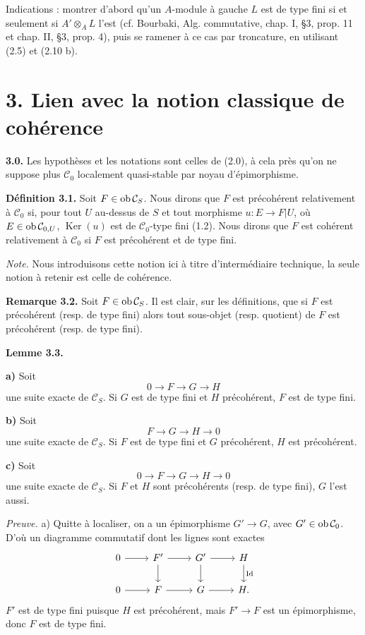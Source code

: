 \documentclass[11pt]{article}
\providecommand{\Ker}{\operatorname{Ker}}
\begin{document}
Indications : montrer d'abord qu'un \(A\)-module à gauche \(L\) est de type fini si et seulement si \(A'\otimes_A L\) l'est (cf. Bourbaki, Alg. commutative, chap. I, §3, prop. 11 et chap. II, §3, prop. 4), puis se ramener à ce cas par troncature, en utilisant (2.5) et (2.10 b).

\section*{3. Lien avec la notion classique de cohérence}

\textbf{3.0.} Les hypothèses et les notations sont celles de (2.0), à cela près qu'on ne suppose plus \(\mathcal C_0\) localement quasi-stable par noyau d'épimorphisme.

\textbf{Définition 3.1.} Soit \(F\in\operatorname{ob}\mathcal C_S\). Nous dirons que \(F\) est précohérent relativement à \(\mathcal C_0\) si, pour tout \(U\) au-dessus de \(S\) et tout morphisme \(u:E\to F|U\), où \(E\in\operatorname{ob}\mathcal C_{0,U}\), \(\Ker(u)\) est de \(\mathcal C_0\)-type fini (1.2). Nous dirons que \(F\) est cohérent relativement à \(\mathcal C_0\) si \(F\) est précohérent et de type fini.

\emph{Note.} Nous introduisons cette notion ici à titre d'intermédiaire technique, la seule notion à retenir est celle de cohérence.

\textbf{Remarque 3.2.} Soit \(F\in\operatorname{ob}\mathcal C_S\). Il est clair, sur les définitions, que si \(F\) est précohérent (resp. de type fini) alors tout sous-objet (resp. quotient) de \(F\) est précohérent (resp. de type fini).

\textbf{Lemme 3.3.}

\textbf{a)} Soit
\[
  0\longrightarrow F\longrightarrow G\longrightarrow H
\]
une suite exacte de \(\mathcal C_S\). Si \(G\) est de type fini et \(H\) précohérent, \(F\) est de type fini.

\textbf{b)} Soit
\[
  F\longrightarrow G\longrightarrow H\longrightarrow 0
\]
une suite exacte de \(\mathcal C_S\). Si \(F\) est de type fini et \(G\) précohérent, \(H\) est précohérent.

\textbf{c)} Soit
\[
  0\longrightarrow F\longrightarrow G\longrightarrow H\longrightarrow 0
\]
une suite exacte de \(\mathcal C_S\). Si \(F\) et \(H\) sont précohérents (resp. de type fini), \(G\) l'est aussi.

\emph{Preuve.} a) Quitte à localiser, on a un épimorphisme \(G'\to G\), avec \(G'\in\operatorname{ob}\mathcal C_0\). D'où un diagramme commutatif dont les lignes sont exactes
\[
\begin{tikzcd}
0\arrow[r]&F'\arrow[r]\arrow[d]&G'\arrow[r]\arrow[d]&H\arrow[d,"\Id"]\\
0\arrow[r]&F\arrow[r]&G\arrow[r]&H .
\end{tikzcd}
\]
\(F'\) est de type fini puisque \(H\) est précohérent, mais \(F'\to F\) est un épimorphisme, donc \(F\) est de type fini.
\end{document}
